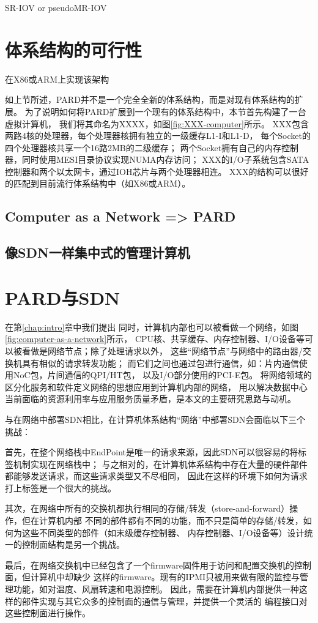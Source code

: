 SR-IOV or pseudoMR-IOV





\section{体系结构的可行性}

在X86或ARM上实现该架构


如上节所述，PARD并不是一个完全全新的体系结构，而是对现有体系结构的扩展。
为了说明如何将PARD扩展到一个现有的体系结构中，本节首先构建了一台虚拟计算机，
我们将其命名为XXXX，如图\ref{fig:XXX-computer}所示。
XXX包含两路4核的处理器，每个处理器核拥有独立的一级缓存L1-I和L1-D，
每个Socket的四个处理器核共享一个16路2MB的二级缓存；
两个Socket拥有自己的内存控制器，同时使用MESI目录协议实现NUMA内存访问；
XXX的I/O子系统包含SATA控制器和两个以太网卡，通过IOH芯片与两个处理器相连。
XXX的结构可以很好的匹配到目前流行体系结构中（如X86或ARM）。

\subsection{Computer as a Network => PARD}

\subsection{像SDN一样集中式的管理计算机}

\section{PARD与SDN}

在第\ref{chap:intro}章中我们提出
同时，计算机内部也可以被看做一个网络，如图\ref{fig:computer-as-a-network}所示，
CPU核、共享缓存、内存控制器、I/O设备等可以被看做是网络节点；除了处理请求以外，
这些“网络节点”与网络中的路由器/交换机具有相似的请求转发功能；
而它们之间也通过包进行通信，如：片内通信使用NoC包，片间通信的QPI/HT包，
以及I/O部分使用的PCI-E包。
将网络领域的区分化服务和软件定义网络的思想应用到计算机内部的网络，
用以解决数据中心当前面临的资源利用率与应用服务质量矛盾，是本文的主要研究思路与动机。

与在网络中部署SDN相比，在计算机体系结构“网络”中部署SDN会面临以下三个挑战：

首先，在整个网络栈中EndPoint是唯一的请求来源，因此SDN可以很容易的将标签机制实现在网络栈中；
与之相对的，在计算机体系结构中存在大量的硬件部件都能够发送请求，而这些请求类型又不尽相同，
因此在这样的环境下如何为请求打上标签是一个很大的挑战。

其次，在网络中所有的交换机都执行相同的存储/转发（store-and-forward）操作，但在计算机内部
不同的部件都有不同的功能，而不只是简单的存储/转发，如何为这些不同类型的部件（如末级缓存控制器、
内存控制器、I/O设备等）设计统一的控制面结构是另一个挑战。

最后，在网络交换机中已经包含了一个firmware固件用于访问和配置交换机的控制面，但计算机中却缺少
这样的firmware。现有的IPMI只被用来做有限的监控与管理功能，如对温度、风扇转速和电源控制。
因此，需要在计算机内部提供一种这样的部件实现与其它众多的控制面的通信与管理，并提供一个灵活的
编程接口对这些控制面进行操作。

\fi
